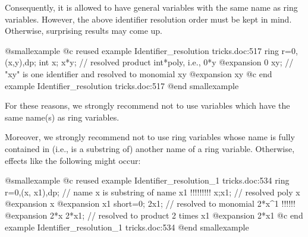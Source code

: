 Consequently, it is allowed to have general variables with the same name
as ring  variables. However, the above identifier resolution order must
be kept in mind. Otherwise, surprising results may come up.

@smallexample
@c reused example Identifier_resolution tricks.doc:517 
ring r=0,(x,y),dp;
int x;
x*y; // resolved product int*poly, i.e., 0*y
@expansion{} 0
xy; // "xy" is one identifier and resolved to monomial xy
@expansion{} xy
@c end example Identifier_resolution tricks.doc:517
@end smallexample

For these reasons, we strongly recommend not to use variables which
have the same name(s) as ring variables.

Moreover, we strongly recommend not to use ring variables whose name is
fully contained in (i.e., is a substring of) another name of a ring
variable. Otherwise, effects like the following might occur:


@smallexample
@c reused example Identifier_resolution_1 tricks.doc:534 
ring r=0,(x, x1),dp; // name x is substring of name x1 !!!!!!!!!
x;x1;   // resolved poly x
@expansion{} x
@expansion{} x1
short=0; 2x1; // resolved to monomial 2*x^1 !!!!!!
@expansion{} 2*x
2*x1; // resolved to product 2 times x1
@expansion{} 2*x1
@c end example Identifier_resolution_1 tricks.doc:534
@end smallexample
